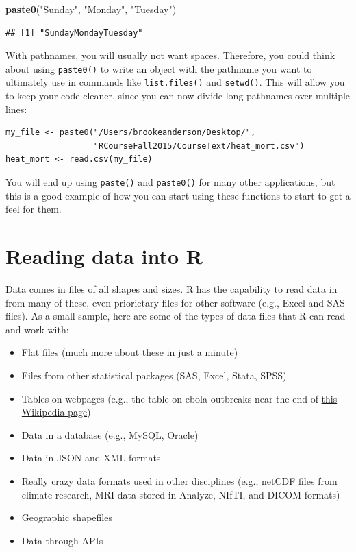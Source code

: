 \documentclass[]{book}
\makeatletter
\newenvironment{Shaded}{\begin{snugshade}}{\end{snugshade}}
\newcommand{\KeywordTok}[1]{\textcolor[rgb]{0.13,0.29,0.53}{\textbf{{#1}}}}
\newcommand{\StringTok}[1]{\textcolor[rgb]{0.31,0.60,0.02}{{#1}}}
\newcommand{\NormalTok}[1]{{#1}}
\providecommand{\tightlist}{%
  \setlength{\itemsep}{0pt}\setlength{\parskip}{0pt}}
\newenvironment{kframe}{%
\medskip{}
\setlength{\fboxsep}{.8em}
 \def\at@end@of@kframe{}%
 \ifinner\ifhmode%
  \def\at@end@of@kframe{\end{minipage}}%
  \begin{minipage}{\columnwidth}%
 \fi\fi%
 \def\FrameCommand##1{\hskip\@totalleftmargin \hskip-\fboxsep
 \colorbox{shadecolor}{##1}\hskip-\fboxsep
     \hskip-\linewidth \hskip-\@totalleftmargin \hskip\columnwidth}%
 \MakeFramed {\advance\hsize-\width
   \@totalleftmargin\z@ \linewidth\hsize
   \@setminipage}}%
 {\par\unskip\endMakeFramed%
 \at@end@of@kframe}
\renewenvironment{Shaded}{\begin{kframe}}{\end{kframe}}
\makeatother
\begin{document}
\begin{Shaded}
\begin{Highlighting}[]
\KeywordTok{paste0}\NormalTok{(}\StringTok{"Sunday"}\NormalTok{, }\StringTok{"Monday"}\NormalTok{, }\StringTok{"Tuesday"}\NormalTok{)}
\end{Highlighting}
\end{Shaded}

\begin{verbatim}
## [1] "SundayMondayTuesday"
\end{verbatim}

With pathnames, you will usually not want spaces. Therefore, you could
think about using \texttt{paste0()} to write an object with the pathname
you want to ultimately use in commands like \texttt{list.files()} and
\texttt{setwd()}. This will allow you to keep your code cleaner, since
you can now divide long pathnames over multiple lines:

\begin{verbatim}
my_file <- paste0("/Users/brookeanderson/Desktop/",
                  "RCourseFall2015/CourseText/heat_mort.csv")
heat_mort <- read.csv(my_file)
\end{verbatim}

You will end up using \texttt{paste()} and \texttt{paste0()} for many
other applications, but this is a good example of how you can start
using these functions to start to get a feel for them.

\section{Reading data into R}\label{reading-data-into-r}

Data comes in files of all shapes and sizes. R has the capability to
read data in from many of these, even priorietary files for other
software (e.g., Excel and SAS files). As a small sample, here are some
of the types of data files that R can read and work with:

\begin{itemize}
\tightlist
\item
  Flat files (much more about these in just a minute)
\item
  Files from other statistical packages (SAS, Excel, Stata, SPSS)
\item
  Tables on webpages (e.g., the table on ebola outbreaks near the end of
  \href{http://en.wikipedia.org/wiki/Ebola_virus_epidemic_in_West_Africa}{this
  Wikipedia page})
\item
  Data in a database (e.g., MySQL, Oracle)
\item
  Data in JSON and XML formats
\item
  Really crazy data formats used in other disciplines (e.g., netCDF
  files from climate research, MRI data stored in Analyze, NIfTI, and
  DICOM formats)
\item
  Geographic shapefiles
\item
  Data through APIs
\end{itemize}
\end{document}

